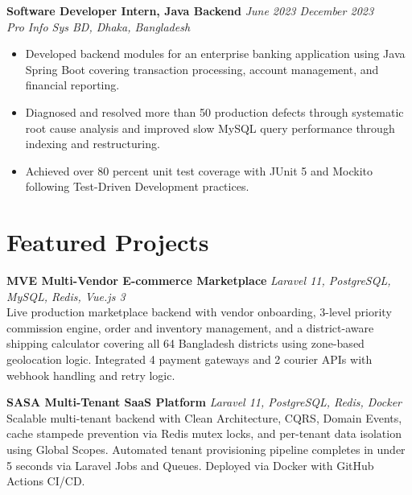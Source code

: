 \documentclass[a4paper,10.5pt]{article}
\begin{document}
\vspace{5pt}

\textbf{Software Developer Intern, Java Backend} \hfill \textit{June 2023 \textemdash{} December 2023}\\
\textit{Pro Info Sys BD, Dhaka, Bangladesh}

\vspace{3pt}
\begin{itemize}[noitemsep, topsep=0pt, leftmargin=1.3em, label={$\bullet$}]
  \item Developed backend modules for an enterprise banking application using Java Spring Boot covering transaction processing, account management, and financial reporting.
  \item Diagnosed and resolved more than 50 production defects through systematic root cause analysis and improved slow MySQL query performance through indexing and restructuring.
  \item Achieved over 80 percent unit test coverage with JUnit 5 and Mockito following Test-Driven Development practices.
\end{itemize}

\vspace{2pt}

\section{Featured Projects}
\vspace{2pt}

\textbf{MVE \textemdash{} Multi-Vendor E-commerce Marketplace} \hfill \textit{Laravel 11, PostgreSQL, MySQL, Redis, Vue.js 3}\\
Live production marketplace backend with vendor onboarding, 3-level priority commission engine, order and inventory management, and a district-aware shipping calculator covering all 64 Bangladesh districts using zone-based geolocation logic. Integrated 4 payment gateways and 2 courier APIs with webhook handling and retry logic.

\vspace{4pt}

\textbf{SASA \textemdash{} Multi-Tenant SaaS Platform} \hfill \textit{Laravel 11, PostgreSQL, Redis, Docker}\\
Scalable multi-tenant backend with Clean Architecture, CQRS, Domain Events, cache stampede prevention via Redis mutex locks, and per-tenant data isolation using Global Scopes. Automated tenant provisioning pipeline completes in under 5 seconds via Laravel Jobs and Queues. Deployed via Docker with GitHub Actions CI/CD.
\end{document}
